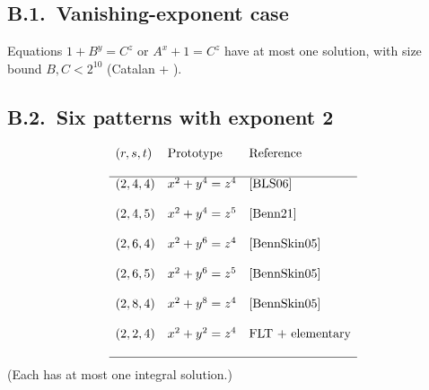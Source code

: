 \documentclass{article}
\begin{document}
\subsection*{B.1.\ Vanishing-exponent case}
Equations $1+B^{y}=C^{z}$ or $A^{x}+1=C^{z}$ have at most one solution,
with size bound $B,C<2^{10}$ (Catalan + \cite{BLS06}).

\subsection*{B.2.\ Six patterns with exponent 2}
\[
\begin{array}{lll}
(r,s,t) & \text{Prototype} & \text{Reference} \\\\ \hline
(2,4,4) & x^{2}+y^{4}=z^{4} & \cite{BLS06} \\\\
(2,4,5) & x^{2}+y^{4}=z^{5} & \cite{Benn21} \\\\
(2,6,4) & x^{2}+y^{6}=z^{4} & \cite{BennSkin05} \\\\
(2,6,5) & x^{2}+y^{6}=z^{5} & \cite{BennSkin05} \\\\
(2,8,4) & x^{2}+y^{8}=z^{4} & \cite{BennSkin05} \\\\
(2,2,4) & x^{2}+y^{2}=z^{4} & \text{FLT + elementary} \\\\ \hline
\end{array}
\]
(Each has at most one integral solution.)
\end{document}
